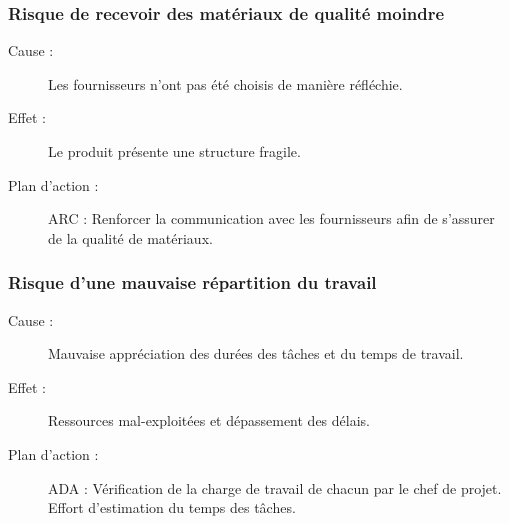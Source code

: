\documentclass[a4paper, 12pt, leqno]{report}
\theoremstyle{plain}
\begin{document}
              \subsubsection{Risque de recevoir des matériaux de qualité moindre}
              \begin{description}
              \item[Cause :] Les fournisseurs n'ont pas été choisis de manière réfléchie.
              \item[Effet :] Le produit présente une structure fragile.
              \item[Plan d'action :] ARC : Renforcer la communication avec les fournisseurs afin de s'assurer de la qualité de matériaux.
              \end{description}
              \subsubsection{Risque d'une mauvaise répartition du travail}
              \begin{description}
              \item[Cause :] Mauvaise appréciation des durées des tâches et du temps de travail.
              \item[Effet :] Ressources mal-exploitées et dépassement des délais.
              \item[Plan d'action :] ADA : Vérification de la charge de travail de chacun par le chef de projet. Effort d'estimation du temps des tâches.
              \end{description}
              
\end{document}
